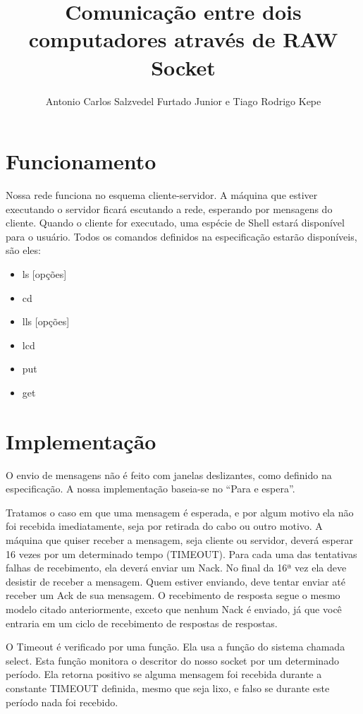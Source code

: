 \documentclass[a4paper,10pt]{coursepaper}
\title{Comunicação entre dois computadores através de RAW Socket}
\author{Antonio Carlos Salzvedel Furtado Junior e Tiago Rodrigo Kepe}
\begin{document}
\maketitle

\section{Funcionamento}

Nossa rede funciona no esquema cliente-servidor. A máquina que estiver executando o servidor ficará escutando a rede,  esperando por mensagens do cliente. Quando o cliente for executado, uma espécie de Shell estará disponível para o usuário. Todos os comandos definidos na especificação estarão disponíveis, são eles:
\begin{itemize}
 \item ls [opções]
 \item cd
 \item lls [opções]
 \item lcd
 \item put
 \item get
\end{itemize}


\section{Implementação}

O envio de mensagens não é feito com janelas deslizantes, como definido na especificação. A nossa implementação baseia-se no ``Para e espera''. 

Tratamos o caso em que uma mensagem é esperada, e por algum motivo ela não foi recebida imediatamente, seja por retirada do cabo ou outro motivo. A máquina que quiser receber a mensagem, seja cliente ou servidor, deverá esperar 16 vezes por um determinado tempo (TIMEOUT). Para cada uma das tentativas falhas de recebimento, ela deverá enviar um Nack. No final da 16ª vez ela deve desistir de receber a mensagem.
Quem estiver enviando, deve tentar enviar até receber um Ack de sua mensagem. O recebimento de resposta segue o mesmo modelo citado anteriormente, exceto que nenhum Nack é enviado, já que você entraria em um ciclo de recebimento de respostas de respostas.


O Timeout é verificado por uma função. Ela usa a função do sistema chamada select. Esta função monitora o descritor do nosso socket por um determinado período. Ela retorna positivo se alguma mensagem foi recebida durante a constante TIMEOUT definida, mesmo que seja lixo, e falso se durante este período nada foi recebido.
\end{document}
